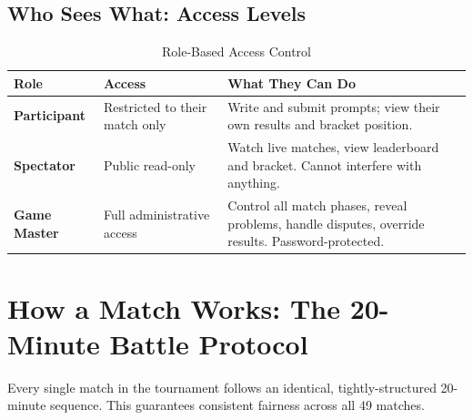 \documentclass[11pt, a4paper]{article}
\begin{document}
\subsection{Who Sees What: Access Levels}

\begin{table}[H]
\centering
\renewcommand{\arraystretch}{1.3}
\begin{tabularx}{\textwidth}{>{\bfseries}l l X}
\toprule
Role & Access & What They Can Do \\
\midrule
Participant  & Restricted to their match only  & Write and submit prompts; view their own results and bracket position. \\
Spectator    & Public read-only                & Watch live matches, view leaderboard and bracket. Cannot interfere with anything. \\
Game Master  & Full administrative access      & Control all match phases, reveal problems, handle disputes, override results. Password-protected. \\
\bottomrule
\end{tabularx}
\caption{Role-Based Access Control}
\end{table}

\section{How a Match Works: The 20-Minute Battle Protocol}

Every single match in the tournament follows an identical, tightly-structured 20-minute sequence. This guarantees consistent fairness across all 49 matches.
\end{document}
